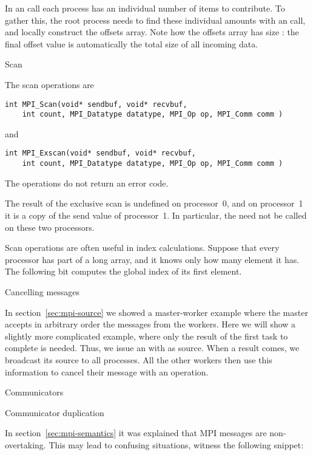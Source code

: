 In an  call each process has an individual
number of items to contribute. To gather this, the root process needs
to find these individual amounts with an  call, and
locally construct the offsets array. Note how the offsets array has
size : the final offset value is automatically the total
size of all incoming data.  
%

 {Scan}

The scan operations are
\begin{verbatim}
int MPI_Scan(void* sendbuf, void* recvbuf, 
    int count, MPI_Datatype datatype, MPI_Op op, MPI_Comm comm ) 
\end{verbatim}
and
\begin{verbatim}
int MPI_Exscan(void* sendbuf, void* recvbuf, 
    int count, MPI_Datatype datatype, MPI_Op op, MPI_Comm comm ) 
\end{verbatim}
The  operations do not return an error code.

The result of the exclusive scan is undefined on processor~0,
and on processor~1 it is a copy of the send value of processor~1.
In particular, the  need not be called on these two 
processors.

Scan operations are often useful in index calculations. Suppose that every processor
has part of a long array, and it knows only how many element it has. The following bit
computes the global index of its first element.

 {Cancelling messages}

In section~\ref{sec:mpi-source} we showed a master-worker example where the 
master accepts in arbitrary order the messages from the workers.
Here we will show a slightly
more complicated example, where only the result of the first task to
complete is needed. Thus, we issue an 
with  as source.  When a result comes, we
broadcast its source to all processes.  All the other workers then use
this information to cancel their message with
an  operation.


 {Communicators}

 {Communicator duplication}

In section~\ref{sec:mpi-semantics} it was explained that MPI messages are 
non-overtaking. This may lead to confusing situations, witness the following snippet:

